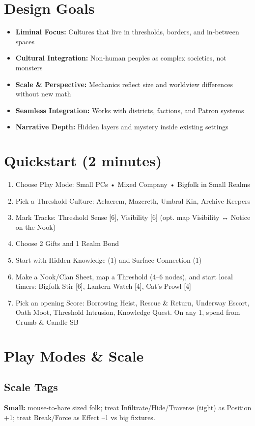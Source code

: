 \documentclass[11pt,letterpaper]{article}
\newcommand{\playmode}[1]{\subsection*{#1}}
\begin{document}
\section*{Design Goals}
\begin{itemize}[leftmargin=*]
\item \textbf{Liminal Focus:} Cultures that live in thresholds, borders, and in-between spaces
\item \textbf{Cultural Integration:} Non-human peoples as complex societies, not monsters  
\item \textbf{Scale \& Perspective:} Mechanics reflect size and worldview differences without new math
\item \textbf{Seamless Integration:} Works with districts, factions, and Patron systems
\item \textbf{Narrative Depth:} Hidden layers and mystery inside existing settings
\end{itemize}

\section*{Quickstart (2 minutes)}
\begin{enumerate}
\item Choose Play Mode: Small PCs • Mixed Company • Bigfolk in Small Realms
\item Pick a Threshold Culture: Aelaerem, Mazereth, Umbral Kin, Archive Keepers
\item Mark Tracks: Threshold Sense [6], Visibility [6] (opt. map Visibility ↔ Notice on the Nook)
\item Choose 2 Gifts and 1 Realm Bond
\item Start with Hidden Knowledge (1) and Surface Connection (1)
\item Make a Nook/Clan Sheet, map a Threshold (4--6 nodes), and start local timers: Bigfolk Stir [6], Lantern Watch [4], Cat's Prowl [4]
\item Pick an opening Score: Borrowing Heist, Rescue \& Return, Underway Escort, Oath Moot, Threshold Intrusion, Knowledge Quest. On any 1, spend from Crumb \& Candle SB
\end{enumerate}

\section{Play Modes \& Scale}

\playmode{Scale Tags}
\textbf{Small:} mouse-to-hare sized folk; treat Infiltrate/Hide/Traverse (tight) as Position +1; treat Break/Force as Effect --1 vs big fixtures.
\end{document}
